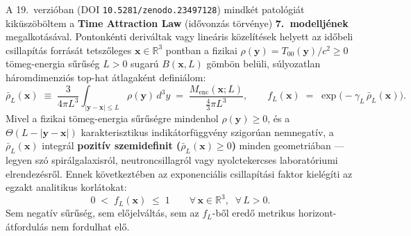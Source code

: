 \par
A 19.\ verzi\'oban (DOI \texttt{10.5281/zenodo.23497128}) mindk\'et patol\'ogi\'at kik\"usz\"ob\"oltem a \textbf{Time Attraction Law} (id\H{o}vonz\'as t\"orv\'enye) \textbf{7.\ modellj\'enek} megalkot\'as\'aval. Pontonk\'enti deriv\'altak vagy line\'aris k\"ozel\'it\'esek helyett az id\H{o}beli csillap\'it\'as forr\'as\'at tetsz\H{o}leges $\mathbf{x} \in \mathbb{R}^3$ pontban a fizikai $\rho(\mathbf{y}) = T_{00}(\mathbf{y})/c^2 \ge 0$ t\"omeg-energia s\H{u}r\H{u}s\'eg $L > 0$ sugar\'u $B(\mathbf{x},L)$ g\"omb\"on bel\"uli, s\'ulyozatlan h\'aromdimenzi\'os top-hat \'atlagak\'ent defini\'alom:
\begin{equation}
  \bar{\rho}_L(\mathbf{x}) \;\equiv\; \frac{3}{4\pi L^3}\int_{|\mathbf{y}-\mathbf{x}|\le L} \rho(\mathbf{y})\,d^3y \;=\; \frac{M_{\text{enc}}(\mathbf{x};L)}{\frac{4}{3}\pi L^3}, \qquad
  f_L(\mathbf{x}) \;=\; \exp\!\bigl(-\gamma_L\,\bar{\rho}_L(\mathbf{x})\bigr).
\end{equation}
Mivel a fizikai t\"omeg-energia s\H{u}r\H{u}s\'egre mindenhol $\rho(\mathbf{y}) \ge 0$, \'es a $\Theta(L - |\mathbf{y}-\mathbf{x}|)$ karakterisztikus indik\'atorf\"uggv\'eny szigor\'uan nemnegat\'iv, a $\bar{\rho}_L(\mathbf{x})$ integr\'al \textbf{pozit\'iv szemidefinit ($\bar{\rho}_L(\mathbf{x}) \ge 0$)} minden geometri\'aban --- legyen sz\'o spir\'algalaxisr\'ol, neutroncsillagr\'ol vagy nyolctekercses laborat\'oriumi elrendez\'esr\H{o}l. Ennek k\"ovetkezt\'eben az exponenci\'alis csillap\'it\'asi faktor kiel\'eg\'iti az egzakt analitikus korl\'atokat:
\begin{equation}
  0 \;<\; f_L(\mathbf{x}) \;\le\; 1 \qquad \forall\,\mathbf{x}\in\mathbb{R}^3,\;\;\forall\,L > 0.
\end{equation}
Sem negat\'iv s\H{u}r\H{u}s\'eg, sem el\H{o}jelv\'alt\'as, sem az $f_L$-b\H{o}l ered\H{o} metrikus horizont-\'atfordul\'as nem fordulhat el\H{o}.

